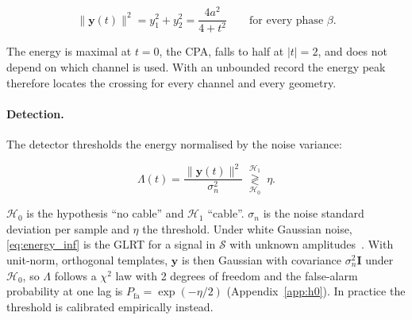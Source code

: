 \begin{equation}
\|\mathbf{y}(t)\|^2 = y_1^2 + y_2^2 = \frac{4a^2}{4 + t^2} \qquad \text{for every phase } \beta.
\label{eq:energy_invariance}
\end{equation}

The energy is maximal at $t = 0$, the CPA, falls to half at $|t| = 2$, and does not depend on which channel is used. With an unbounded record the energy peak therefore locates the crossing for every channel and every geometry.

\paragraph{Detection.} The detector thresholds the energy normalised by the noise variance:

\begin{equation}
\Lambda(t) = \frac{\|\mathbf{y}(t)\|^2}{\sigma_n^2} \;\overset{\mathcal{H}_1}{\underset{\mathcal{H}_0}{\gtrless}}\; \eta.
\label{eq:energy_inf}
\end{equation}

$\mathcal{H}_0$ is the hypothesis ``no cable'' and $\mathcal{H}_1$ ``cable''. $\sigma_n$ is the noise standard deviation per sample and $\eta$ the threshold. Under white Gaussian noise, \eqref{eq:energy_inf} is the GLRT for a signal in $\mathcal{S}$ with unknown amplitudes~\cite{hleis2026obf,kay1998detection,scharf1994matched}. With unit-norm, orthogonal templates, $\mathbf{y}$ is then Gaussian with covariance $\sigma_n^2 \mathbf{I}$ under $\mathcal{H}_0$, so $\Lambda$ follows a $\chi^2$ law with 2 degrees of freedom and the false-alarm probability at one lag is $P_{\mathrm{fa}} = \exp(-\eta/2)$ (Appendix~\ref{app:h0}). In practice the threshold is calibrated empirically instead.